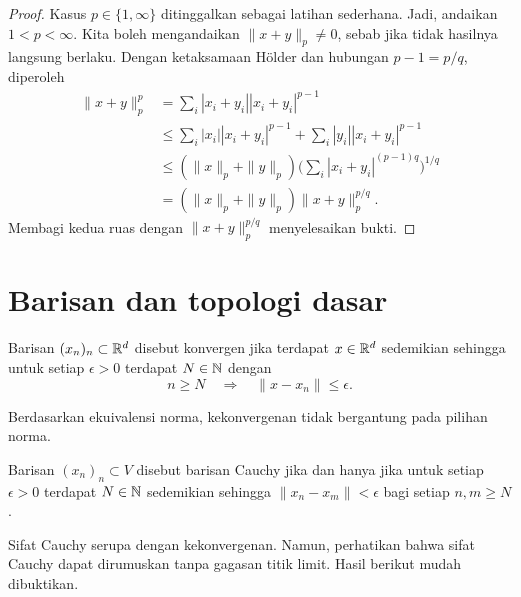 \begin{proof}
    Kasus $p\in\{1,\infty\}$ ditinggalkan sebagai latihan sederhana. Jadi,
    andaikan $1<p<\infty$. Kita boleh mengandaikan $\|x+y\|_p\neq0$, sebab
    jika tidak hasilnya langsung berlaku. Dengan ketaksamaan Hölder dan
    hubungan $p-1=p/q$, diperoleh
    \begin{equation}
        \begin{aligned}
            \|x+y\|_p^p
            &=\sum_i|x_i+y_i||x_i+y_i|^{p-1}\\
            &\leq\sum_i|x_i||x_i+y_i|^{p-1}
                 +\sum_i|y_i||x_i+y_i|^{p-1}\\
            &\leq(\|x\|_p+\|y\|_p)
            \bigg(\sum_i|x_i+y_i|^{(p-1)q}\bigg)^{1/q}\\
            &=(\|x\|_p+\|y\|_p)\|x+y\|_p^{p/q}.
        \end{aligned}
    \end{equation}
    Membagi kedua ruas dengan $\|x+y\|_p^{p/q}$ menyelesaikan bukti.
\end{proof}

\section{Barisan dan topologi dasar}

\begin{defn}
    Barisan $(x_n)_n\subset\mathbb{R}^d$ disebut konvergen jika terdapat $x\in\mathbb{R}^d$
    sedemikian sehingga untuk setiap $\epsilon>0$ terdapat $N\in\mathbb{N}$ dengan
    \begin{equation}
        n\geq N\quad\Longrightarrow\quad\|x-x_n\|\leq\epsilon.
    \end{equation}
\end{defn}

\begin{rem}
    Berdasarkan ekuivalensi norma, kekonvergenan tidak bergantung pada pilihan
    norma.
\end{rem}

\begin{defn}
    Barisan $(x_n)_n\subset V$ disebut barisan Cauchy jika dan hanya jika untuk
    setiap $\epsilon>0$ terdapat $N\in\mathbb{N}$ sedemikian sehingga
    $\|x_n-x_m\|<\epsilon$ bagi setiap $n,m\geq N$.
\end{defn}

Sifat Cauchy serupa dengan kekonvergenan. Namun, perhatikan bahwa sifat Cauchy
dapat dirumuskan tanpa gagasan titik limit. Hasil berikut mudah dibuktikan.

